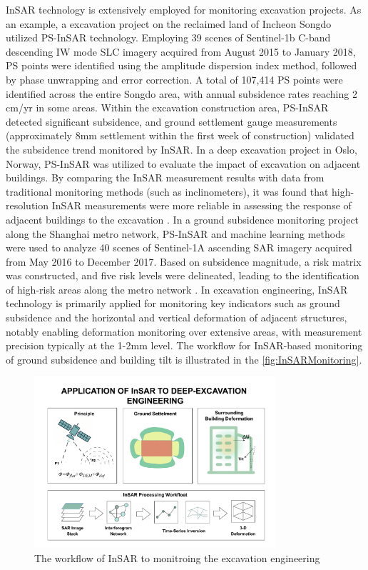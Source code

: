 \documentclass[preprint,11pt,authoryear,3p]{elsarticle}
\begin{document}
InSAR technology is extensively employed for monitoring excavation projects. As an example, a excavation project on the reclaimed land of Incheon Songdo utilized PS-InSAR technology. Employing 39 scenes of Sentinel-1b C-band descending IW mode SLC imagery acquired from August 2015 to January 2018, PS points were identified using the amplitude dispersion index method, followed by phase unwrapping and error correction. A total of 107,414 PS points were identified across the entire Songdo area, with annual subsidence rates reaching 2 cm/yr in some areas. Within the excavation construction area, PS-InSAR detected significant subsidence, and ground settlement gauge measurements (approximately 8mm settlement within the first week of construction) validated the subsidence trend monitored by InSAR. In a deep excavation project in Oslo, Norway, PS-InSAR was utilized to evaluate the impact of excavation on adjacent buildings. By comparing the InSAR measurement results with data from traditional monitoring methods (such as inclinometers), it was found that high-resolution InSAR measurements were more reliable in assessing the response of adjacent buildings to the excavation \citep{ritter2021insar}. In a ground subsidence monitoring project along the Shanghai metro network, PS-InSAR and machine learning methods were used to analyze 40 scenes of Sentinel-1A ascending SAR imagery acquired from May 2016 to December 2017. Based on subsidence magnitude, a risk matrix was constructed, and five risk levels were delineated, leading to the identification of high-risk areas along the metro network \citep{chen2023integration}. In excavation engineering, InSAR technology is primarily applied for monitoring key indicators such as ground subsidence and the horizontal and vertical deformation of adjacent structures, notably enabling deformation monitoring over extensive areas, with measurement precision typically at the 1-2mm level. The workflow for InSAR-based monitoring of ground subsidence and building tilt is illustrated in the \autoref{fig:InSARMonitoring}.

\begin{figure}[h]
    \begin{center}
        \includegraphics[width=0.8\textwidth]{imgs/InSAR_Flow.pdf}
        \caption{The workflow of InSAR to monitroing the excavation engineering}
        \label{fig:InSARMonitoring}
    \end{center}
\end{figure}
\end{document}
